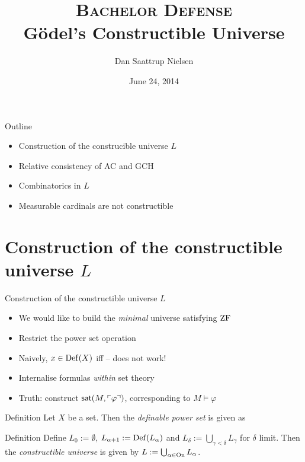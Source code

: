 

\title{{\scshape\small Bachelor Defense}\\ Gödel's Constructible Universe}
\author{Dan Saattrup Nielsen}
\date{{\tiny June 24, 2014}}



\begin{frame}[plain]
	\titlepage
\end{frame}

\begin{frame}{Outline}
	\begin{itemize}
		\item Construction of the construcible universe $L$
		\item Relative consistency of AC and GCH
		\item Combinatorics in $L$
		\item Measurable cardinals are not constructible
	\end{itemize}
\end{frame}


\section[Construction of $L$]{Construction of the constructible universe $L$}
\begin{frame}{Construction of the constructible universe $L$}
	\begin{itemize}
		\item We would like to build the \textit{minimal} universe satisfying $\operatorname{ZF}$
		\pause\item Restrict the power set operation
		\pause\item Naively, $x\in\operatorname{Def}(X)$ iff
			\pause -- does not work!
		\pause\item Internalise formulas \textit{within} set theory
		\pause\item Truth: construct $\textsf{sat}(M,\ulcorner \varphi \urcorner)$, corresponding to $M\models\varphi$
	\end{itemize}
\end{frame}

\begin{frame}
	\begin{block}{Definition}
		Let $X$ be a set. Then the \textit{definable power set} is given as
	\end{block}
	
	\pause\begin{block}{Definition}
		Define $L_0:=\emptyset$, $L_{\alpha+1}:=\operatorname{Def}(L_\alpha)$ and $L_\delta:=\bigcup_{\gamma<\delta}L_\gamma$ for $\delta$ limit. Then the \textit{constructible universe} is given by $L:=\bigcup_{\alpha\in\operatorname{On}}L_\alpha$.
	\end{block}
\end{frame}

